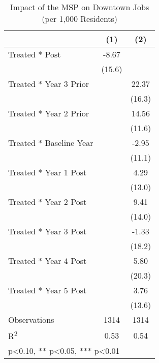 \begin{table}[htbp]\centering
\def\sym#1{\ifmmode^{#1}\else\(^{#1}\)\fi}
\caption{Impact of the MSP on Downtown Jobs (per 1,000 Residents)}
\begin{tabular}{l*{2}{c}}
\hline\hline
            &\multicolumn{1}{c}{(1)}   &\multicolumn{1}{c}{(2)}   \\
\hline
Treated * Post&       -8.67   &               \\
            &      (15.6)   &               \\
Treated * Year 3 Prior&               &       22.37   \\
            &               &      (16.3)   \\
Treated * Year 2 Prior&               &       14.56   \\
            &               &      (11.6)   \\
Treated * Baseline Year&               &       -2.95   \\
            &               &      (11.1)   \\
Treated * Year 1 Post&               &        4.29   \\
            &               &      (13.0)   \\
Treated * Year 2 Post&               &        9.41   \\
            &               &      (14.0)   \\
Treated * Year 3 Post&               &       -1.33   \\
            &               &      (18.2)   \\
Treated * Year 4 Post&               &        5.80   \\
            &               &      (20.3)   \\
Treated * Year 5 Post&               &        3.76   \\
            &               &      (13.6)   \\
\hline
Observations &        1314   &        1314   \\
R\textsuperscript{2} &        0.53   &        0.54   \\
\hline\hline
\multicolumn{3}{l}{\footnotesize * p<0.10, ** p<0.05, *** p<0.01}\\
\end{tabular}
\end{table}

